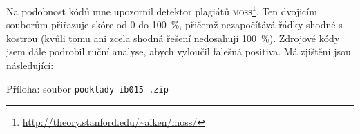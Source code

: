 Na podobnost kódů mne upozornil detektor plagiátů
\textsc{moss}\footnote{\url{http://theory.stanford.edu/~aiken/moss/}}. Ten
dvojicím souborům přiřazuje skóre od 0 do 100~\%, přičemž nezapočítává řádky
shodné s kostrou (kvůli tomu ani zcela shodná řešení nedosahují 100~\%).
Zdrojové kódy jsem dále podrobil ruční analyse, abych vyloučil falešná positiva.
Má zjištění jsou následující:

\begin{zjisteni}
    \Zjisteni
\end{zjisteni}

\Zaver

\bigskip
\bigskip
\raggedright Příloha: soubor \texttt{podklady-ib015-\UCO.zip}




